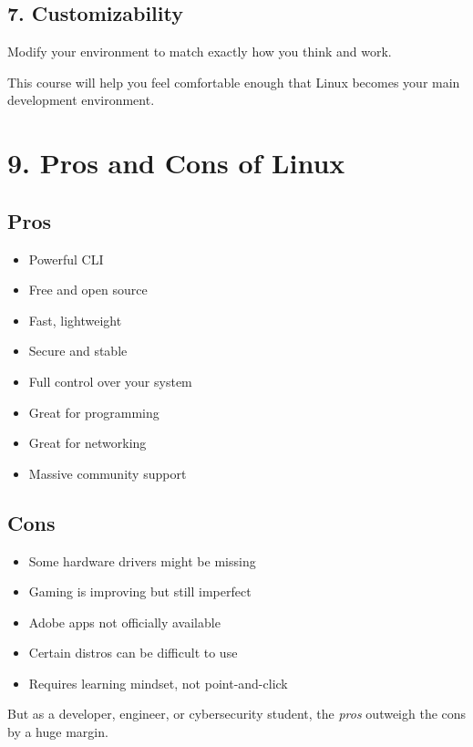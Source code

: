 \documentclass[12pt]{article}
\begin{document}
\subsection*{7. Customizability}
Modify your environment to match exactly how you think and work.

\begin{infobox}
This course will help you feel comfortable enough that Linux becomes your main development environment.
\end{infobox}

\section*{9. Pros and Cons of Linux}

\subsection*{Pros}
\begin{itemize}
    \item Powerful CLI
    \item Free and open source
    \item Fast, lightweight
    \item Secure and stable
    \item Full control over your system
    \item Great for programming
    \item Great for networking
    \item Massive community support
\end{itemize}

\subsection*{Cons}
\begin{itemize}
    \item Some hardware drivers might be missing
    \item Gaming is improving but still imperfect
    \item Adobe apps not officially available
    \item Certain distros can be difficult to use
    \item Requires learning mindset, not point-and-click
\end{itemize}

But as a developer, engineer, or cybersecurity student, the \textit{pros} outweigh the cons by a huge margin.
\end{document}
